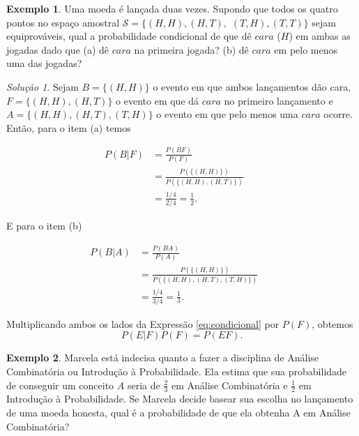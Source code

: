 \documentclass[]{book}
\theoremstyle{definition}
\theoremstyle{definition}
\newtheorem{example}{Exemplo}[chapter]
\theoremstyle{definition}
\theoremstyle{remark}
\newtheorem*{solution}{Solução}
\begin{document}
\begin{example}
\protect\hypertarget{exm:unnamed-chunk-146}{}{\label{exm:unnamed-chunk-146} }Uma moeda é lançada duas vezes.
Supondo que todos os quatro pontos no espaço amostral \(\mathcal{S} = \{(H,H), (H,T),\) \((T,H), (T,T)\}\) sejam equiprováveis, qual a probabilidade condicional de que dê \(cara\) (\(H\)) em ambas as jogadas dado que (a) dê \(cara\) na primeira jogada? (b) dê \(cara\) em pelo menos uma das jogadas?
\end{example}

\begin{solution}
\iffalse{} {Solução. } \fi{}Sejam \(B=\{(H,H)\}\) o evento em que ambos lançamentos dão cara, \(F=\{(H,H),(H,T)\}\) o evento em que dá \(cara\) no primeiro lançamento e \(A=\{(H,H),(H,T),(T,H)\}\) o evento em que pelo menos uma \(cara\) ocorre.
Então, para o item (a) temos

\begin{align}
P(B|F) &= \frac{P(BF)}{P(F)}\\
&=\frac{P(\{(H,H)\})}{P(\{(H,H),(H,T)\})} &&\\
&=\frac{1/4}{2/4}=\frac{1}{2}.
\end{align}

E para o item (b)

\begin{align}
P(B|A) &= \frac{P(BA)}{P(A)}\\
&=\frac{P(\{(H,H)\})}{P(\{(H,H),(H,T),(T,H)\})} &&\\
&=\frac{1/4}{3/4}=\frac{1}{3}.
\end{align}
\end{solution}

Multiplicando ambos os lados da Expressão \eqref{eq:condicional} por \(P(F)\), obtemos
\begin{equation}
P(E|F)P(F) = P(EF).
\label{eq:condicional2}
\end{equation}

\begin{example}
\protect\hypertarget{exm:unnamed-chunk-148}{}{\label{exm:unnamed-chunk-148} }Marcela está indecisa quanto a fazer a disciplina de Análise Combinatória ou Introdução à Probabilidade.
Ela estima que sua probabilidade de conseguir um conceito \(A\) seria de \(\frac{2}{3}\) em Análise Combinatória e \(\frac{1}{2}\) em Introdução à Probabilidade.
Se Marcela decide basear sua escolha no lançamento de uma moeda honesta, qual é a probabilidade de que ela obtenha A em Análise Combinatória?
\end{example}
\end{document}

